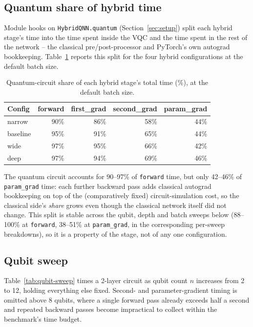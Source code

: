 \subsection{Quantum share of hybrid time}
\label{sec:res-qshare}
Module hooks on \texttt{HybridQNN.quantum} (Section~\ref{sec:setup}) split each hybrid stage's time into the
time spent inside the VQC and the time spent in the rest of the network -- the classical pre/post-processor
and PyTorch's own autograd bookkeeping. Table~\ref{tab:qshare} reports this split for the four hybrid
configurations at the default batch size.

\begin{table}[h]
\centering
\caption{Quantum-circuit share of each hybrid stage's total time (\%), at the default batch size.}
\label{tab:qshare}
\small
\begin{tabular}{@{}lrrrr@{}}
\toprule
Config & forward & first\_grad & second\_grad & param\_grad \\
\midrule
narrow   & 90\% & 86\% & 58\% & 44\% \\
baseline & 95\% & 91\% & 65\% & 44\% \\
wide     & 97\% & 95\% & 66\% & 42\% \\
deep     & 97\% & 94\% & 69\% & 46\% \\
\bottomrule
\end{tabular}
\end{table}

The quantum circuit accounts for 90--97\% of \texttt{forward} time, but only 42--46\% of \texttt{param\_grad}
time: each further backward pass adds classical autograd bookkeeping on top of the (comparatively fixed)
circuit-simulation cost, so the classical side's \emph{share} grows even though the classical network itself
did not change. This split is stable across the qubit, depth and batch sweeps below (88--100\% at
\texttt{forward}, 38--51\% at \texttt{param\_grad}, in the corresponding per-sweep breakdowns), so it is a
property of the stage, not of any one configuration.

\subsection{Qubit sweep}
\label{sec:res-qubit}
Table~\ref{tab:qubit-sweep} times a 2-layer circuit as qubit count $n$ increases from 2 to 12, holding
everything else fixed. Second- and parameter-gradient timing is omitted above 8 qubits, where a single
forward pass already exceeds half a second and repeated backward passes become impractical to collect within
the benchmark's time budget.

